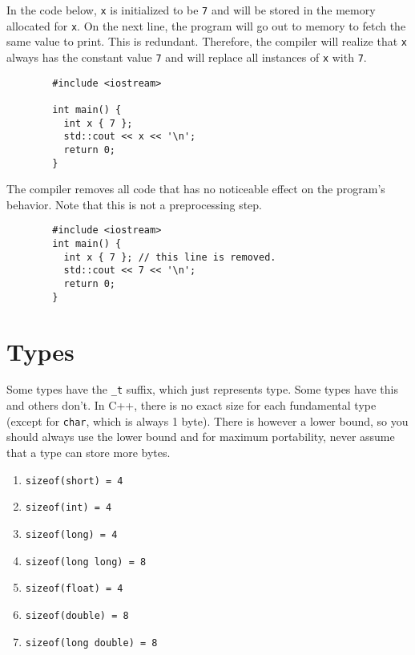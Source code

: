 \documentclass{article}
\begin{document}
    \begin{definition}
      In the code below, \texttt{x} is initialized to be \texttt{7} and will be stored in the memory allocated for \texttt{x}. On the next line, the program will go out to memory to fetch the same value to print. This is redundant. Therefore, the compiler will realize that \texttt{x} always has the constant value \texttt{7} and will replace all instances of \texttt{x} with \texttt{7}. 
      \begin{lstlisting}
        #include <iostream>

        int main() {
          int x { 7 };
          std::cout << x << '\n';
          return 0;
        } 
      \end{lstlisting}
    \end{definition}

    \begin{definition}
      The compiler removes all code that has no noticeable effect on the program's behavior. Note that this is not a preprocessing step. 
      \begin{lstlisting}
        #include <iostream>
        int main() {
          int x { 7 }; // this line is removed. 
          std::cout << 7 << '\n';
          return 0;
        } 
      \end{lstlisting}
    \end{definition}

\section{Types} 

  Some types have the \texttt{\_t} suffix, which just represents type. Some types have this and others don't. In C++, there is no exact size for each fundamental type (except for \texttt{char}, which is always 1 byte). There is however a lower bound, so you should always use the lower bound and for maximum portability, never assume that a type can store more bytes. 
  \begin{enumerate}
    \item \texttt{sizeof(short) = 4}
    \item \texttt{sizeof(int) = 4}
    \item \texttt{sizeof(long) = 4}
    \item \texttt{sizeof(long long) = 8}
    \item \texttt{sizeof(float) = 4}
    \item \texttt{sizeof(double) = 8}
    \item \texttt{sizeof(long double) = 8}
  \end{enumerate} 
\end{document}
